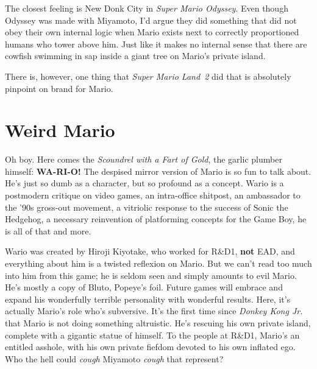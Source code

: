 \documentclass{book}
\begin{document}
The closest feeling is New Donk City in \emph{Super Mario Odyssey}. Even though Odyssey was made with Miyamoto, I’d argue they did something that did not obey their own internal logic when Mario exists next to correctly proportioned humans who tower above him. Just like it makes no internal sense that there are cowfish swimming in sap inside a giant tree on Mario’s private island.\par
\FloatBarrier\vspace{\baselineskip}\begin{figure}[H]\end{figure}
There is, however, one thing that \emph{Super Mario Land~2} did that is absolutely pinpoint on brand for Mario.\par
\FloatBarrier\vspace{\baselineskip}\begin{figure}[H]\end{figure}
\FloatBarrier\section*{Weird Mario}
Oh boy. Here comes the \emph{Scoundrel with a Fart of Gold}, the garlic plumber himself: \textbf{WA-RI-O!} The despised mirror version of Mario is so fun to talk about. He’s just so dumb as a character, but so profound as a concept. Wario is a postmodern critique on video games, an intra-office shitpost, an ambassador to the ’90s gross-out movement, a vitriolic response to the success of Sonic the Hedgehog, a necessary reinvention of platforming concepts for the Game Boy, he is all of that and more.\par
Wario was created by Hiroji Kiyotake, who worked for R\&D1, \textbf{not} EAD, and everything about him is a twisted reflexion on Mario. But we can’t read too much into him from this game; he is seldom seen and simply amounts to evil Mario. He’s mostly a copy of Bluto, Popeye’s foil. Future games will embrace and expand his wonderfully terrible personality with wonderful results. Here, it’s actually Mario’s role who’s subversive. It’s the first time since \emph{Donkey Kong Jr.} that Mario is not doing something altruistic. He’s rescuing his own private island, complete with a gigantic statue of himself. To the people at R\&D1, Mario’s an entitled asshole, with his own private fiefdom devoted to his own inflated ego. Who the hell could \emph{cough} Miyamoto \emph{cough} that represent?\par
\end{document}
